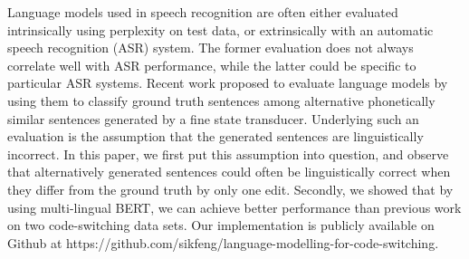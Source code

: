 Language models used in speech recognition are often either evaluated intrinsically using perplexity on test data, or extrinsically with an automatic speech recognition (ASR) system. The former evaluation does not always correlate well with ASR performance, while the latter could be specific to particular ASR systems. Recent work proposed to evaluate language models by using them to classify ground truth sentences among alternative phonetically similar sentences generated by a fine state transducer. Underlying such an evaluation is the assumption that the generated sentences are linguistically incorrect. In this paper, we first put this assumption into question, and observe that alternatively generated sentences could often be linguistically correct when they differ from the ground truth by only one edit. Secondly, we showed that by using multi-lingual BERT, we can achieve better performance than previous work on two code-switching data sets. Our implementation is publicly available on Github at https://github.com/sikfeng/language-modelling-for-code-switching.
